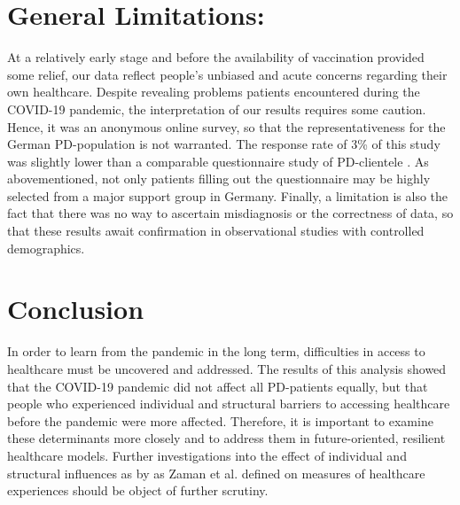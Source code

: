 \documentclass[a4paper,oneside,11pt,english]{scrartcl}
\begin{document}
\section*{General Limitations:}
At a relatively early stage and before the availability of vaccination provided some relief, our data reflect people's unbiased and acute concerns regarding their own healthcare. Despite revealing problems patients encountered during the \textsc{COVID}-19 pandemic, the interpretation of our results requires some caution. Hence, it was an anonymous online survey, so that the representativeness for the German \textsc{PD}-population is not warranted. The response rate of 3\% of this study was slightly lower than a comparable questionnaire study of \textsc{PD}-clientele \cite{frundt2022impact}. As abovementioned, not only patients filling out the questionnaire may be highly selected from a major support group in Germany. Finally, a limitation is also the fact that there was no way to ascertain misdiagnosis or the correctness of data, so that these results await confirmation in observational studies with controlled demographics.

\section*{Conclusion}
In order to learn from the pandemic in the long term, difficulties in access to healthcare must be uncovered and addressed. The results of this analysis showed that the \textsc{COVID}-19 pandemic did not affect all \textsc{\textsc{PD}}-patients equally, but that people who experienced individual and structural barriers to accessing healthcare before the pandemic were more affected. Therefore, it is important to examine these determinants more closely and to address them in future-oriented, resilient healthcare models. Further investigations into the effect of individual and structural influences as by as Zaman et al. defined on measures of healthcare experiences should be object of further scrutiny. 
\newpage

% 
\printbibliography %

\newpage
\end{document}
